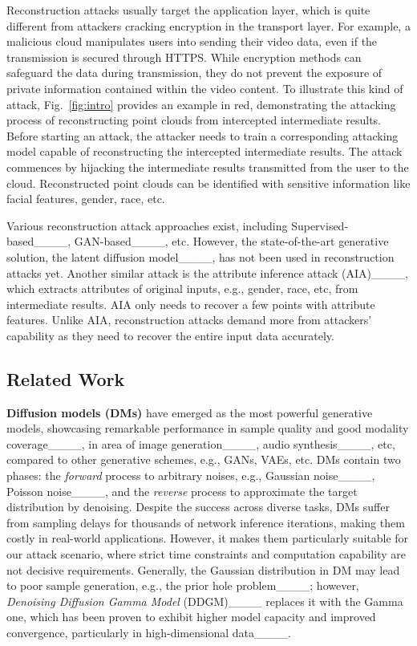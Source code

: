Reconstruction attacks usually target the application layer, which is quite different from attackers cracking encryption in the transport layer. For example, a malicious cloud manipulates users into sending their video data, even if the transmission is secured through HTTPS. While encryption methods can safeguard the data during transmission, they do not prevent the exposure of private information contained within the video content. To illustrate this kind of attack, Fig.~\ref{fig:intro} provides an example in red, demonstrating the attacking process of reconstructing point clouds from intercepted intermediate results. 
Before starting an attack, the attacker needs to train a corresponding attacking model capable of reconstructing the intercepted intermediate results. The attack commences by hijacking the intermediate results transmitted from the user to the cloud.
Reconstructed point clouds can be identified with sensitive information like facial features, gender, race, etc.

Various reconstruction attack approaches exist, including Supervised-based____, GAN-based____, etc. However, the state-of-the-art generative solution, the latent diffusion model____, has not been used in reconstruction attacks yet. 
Another similar attack is the attribute inference attack (AIA)____, which extracts attributes of original inputs, e.g., gender, race, etc, from intermediate results. AIA only needs to recover a few points with attribute features.
Unlike AIA, reconstruction attacks demand more from attackers' capability as they need to recover the entire input data accurately.

\subsection{Related Work}
\textbf{Diffusion models (DMs)} have emerged as the most powerful generative models, showcasing remarkable performance in sample quality and good modality coverage____, in area of image generation____, audio synthesis____, etc, compared to other generative schemes, e.g., GANs, VAEs, etc.
DMs contain two phases: the \textit{forward} process to arbitrary noises, e.g., Gaussian noise____, Poisson noise____, and the \textit{reverse} process to approximate the target distribution by denoising. 
Despite the success across diverse tasks, DMs suffer from sampling delays for thousands of network inference iterations, making them costly in real-world applications. However, it makes them particularly suitable for our attack scenario, where strict time constraints and computation capability are not decisive requirements. 
Generally, the Gaussian distribution in DM may lead to poor sample generation, e.g., the prior hole problem____; however,
\textit{Denoising Diffusion Gamma Model} (DDGM)____ replaces it with the Gamma one, which has been proven to exhibit higher model capacity and improved convergence, particularly in high-dimensional data____.


